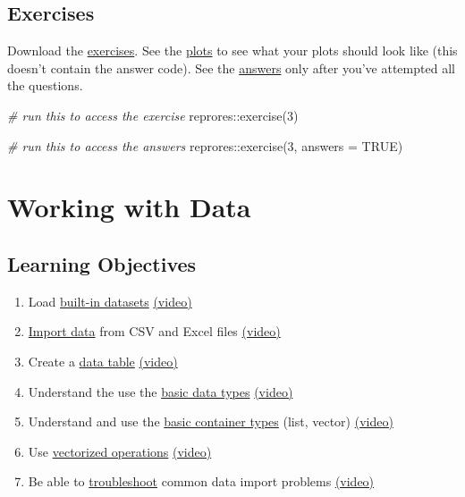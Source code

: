 \documentclass[
  oneside]{book}
\newenvironment{Shaded}{\begin{snugshade}}{\end{snugshade}}
\newcommand{\AttributeTok}[1]{\textcolor[rgb]{0.77,0.63,0.00}{#1}}
\newcommand{\CommentTok}[1]{\textcolor[rgb]{0.56,0.35,0.01}{\textit{#1}}}
\newcommand{\ConstantTok}[1]{\textcolor[rgb]{0.00,0.00,0.00}{#1}}
\newcommand{\DecValTok}[1]{\textcolor[rgb]{0.00,0.00,0.81}{#1}}
\newcommand{\FunctionTok}[1]{\textcolor[rgb]{0.00,0.00,0.00}{#1}}
\newcommand{\NormalTok}[1]{#1}
\newcommand{\SpecialCharTok}[1]{\textcolor[rgb]{0.00,0.00,0.00}{#1}}
\providecommand{\tightlist}{%
  \setlength{\itemsep}{0pt}\setlength{\parskip}{0pt}}
\begin{document}
\hypertarget{exercises-ggplot}{%
\section{Exercises}\label{exercises-ggplot}}

Download the \href{exercises/03_ggplot_exercise.Rmd}{exercises}. See the \href{exercises/03_ggplot_answers.html}{plots} to see what your plots should look like (this doesn't contain the answer code). See the \href{exercises/03_ggplot_answers.Rmd}{answers} only after you've attempted all the questions.

\begin{Shaded}
\begin{Highlighting}[]
\CommentTok{\# run this to access the exercise}
\NormalTok{reprores}\SpecialCharTok{::}\FunctionTok{exercise}\NormalTok{(}\DecValTok{3}\NormalTok{)}

\CommentTok{\# run this to access the answers}
\NormalTok{reprores}\SpecialCharTok{::}\FunctionTok{exercise}\NormalTok{(}\DecValTok{3}\NormalTok{, }\AttributeTok{answers =} \ConstantTok{TRUE}\NormalTok{)}
\end{Highlighting}
\end{Shaded}

\hypertarget{data}{%
\chapter{Working with Data}\label{data}}

\hypertarget{ilo2}{%
\section{Learning Objectives}\label{ilo2}}

\begin{enumerate}
\def\labelenumi{\arabic{enumi}.}
\tightlist
\item
  Load \protect\hyperlink{builtin}{built-in datasets} \href{https://youtu.be/Z5fK5VGmzlY}{(video)}
\item
  \protect\hyperlink{import_data}{Import data} from CSV and Excel files \href{https://youtu.be/a7Ra-hnB8l8}{(video)}
\item
  Create a \protect\hyperlink{tables-data}{data table} \href{https://youtu.be/k-aqhurepb4}{(video)}
\item
  Understand the use the \protect\hyperlink{data_types}{basic data types} \href{https://youtu.be/jXQrF18Jaac}{(video)}
\item
  Understand and use the \protect\hyperlink{containers}{basic container types} (list, vector) \href{https://youtu.be/4xU7uKNdoig}{(video)}
\item
  Use \protect\hyperlink{vectorized_ops}{vectorized operations} \href{https://youtu.be/9I5MdS7UWmI}{(video)}
\item
  Be able to \protect\hyperlink{Troubleshooting}{troubleshoot} common data import problems \href{https://youtu.be/gcxn4LJ_vAI}{(video)}
\end{enumerate}
\end{document}
